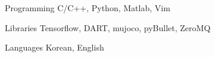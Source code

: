 

\begin{cvskills}

  \cvskill
    {Programming} %
    {C/C++, Python, Matlab, Vim} %

  \cvskill
    {Libraries} %
    {Tensorflow, DART, mujoco, pyBullet, ZeroMQ} %

  \cvskill
    {Languages} %
    {Korean, English} %

\end{cvskills}
